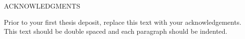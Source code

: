 \begin{doublespace}
\begin{tightcenter}
ACKNOWLEDGMENTS
\mylinespacing
\end{tightcenter}

Prior to your first thesis deposit, replace this text with your acknowledgements.  This text should be double spaced and each paragraph should be indented.  

\mylinespacing
\begin{tightcenter}
\myoptpg
\end{tightcenter}
\end{doublespace}
